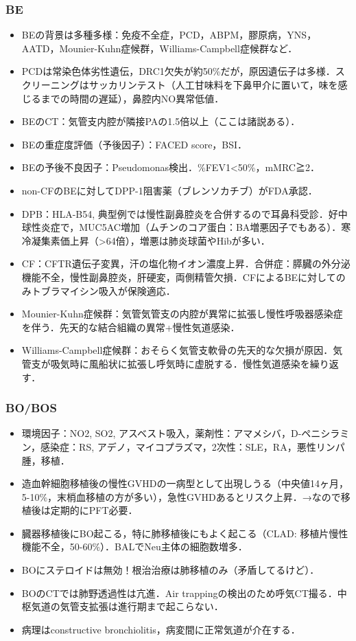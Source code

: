 \subsubsection{BE}

\begin{itemize}
\item BEの背景は多種多様：免疫不全症，PCD，ABPM，膠原病，YNS，AATD，Mounier-Kuhn症候群，Williams-Campbell症候群など．
\item PCDは常染色体劣性遺伝，DRC1欠失が約50\%だが，原因遺伝子は多様．スクリーニングはサッカリンテスト（人工甘味料を下鼻甲介に置いて，味を感じるまでの時間の遅延），鼻腔内NO異常低値．
\item BEのCT：気管支内腔が隣接PAの1.5倍以上（ここは諸説ある）．
\item BEの重症度評価（予後因子）：FACED score，BSI．
\item BEの予後不良因子：Pseudomonas検出．\%FEV1<50\%，mMRC≧2．


\item non-CFのBEに対してDPP-1阻害薬（ブレンソカチブ）がFDA承認．
\item DPB：HLA-B54, 典型例では慢性副鼻腔炎を合併するので耳鼻科受診．好中球性炎症で，MUC5AC増加（ムチンのコア蛋白：BA増悪因子でもある）．寒冷凝集素価上昇（>64倍），増悪は肺炎球菌やHibが多い．
\item CF：CFTR遺伝子変異，汗の塩化物イオン濃度上昇．合併症：膵臓の外分泌機能不全，慢性副鼻腔炎，肝硬変，両側精管欠損．CFによるBEに対してのみトブラマイシン吸入が保険適応．
\item Mounier-Kuhn症候群：気管気管支の内腔が異常に拡張し慢性呼吸器感染症を伴う．先天的な結合組織の異常+慢性気道感染．
\item Williams-Campbell症候群：おそらく気管支軟骨の先天的な欠損が原因．気管支が吸気時に風船状に拡張し呼気時に虚脱する．慢性気道感染を繰り返す．
\end{itemize}


\subsubsection{BO/BOS}

\begin{itemize}
\item 環境因子：NO2, SO2, アスベスト吸入，薬剤性：アマメシバ，D-ペニシラミン，感染症：RS, アデノ，マイコプラズマ，2次性：SLE，RA，悪性リンパ腫，移植．
\item 造血幹細胞移植後の慢性GVHDの一病型として出現しうる（中央値14ヶ月，5-10\%，末梢血移植の方が多い），急性GVHDあるとリスク上昇．→なので移植後は定期的にPFT必要．
\item 臓器移植後にBO起こる，特に肺移植後にもよく起こる（CLAD: 移植片慢性機能不全，50-60\%）．BALでNeu主体の細胞数増多．
\item BOにステロイドは無効！根治治療は肺移植のみ（矛盾してるけど）．
\item BOのCTでは肺野透過性は亢進．Air trappingの検出のため呼気CT撮る．中枢気道の気管支拡張は進行期まで起こらない．
\item 病理はconstructive bronchiolitis，病変間に正常気道が介在する．
\end{itemize}


